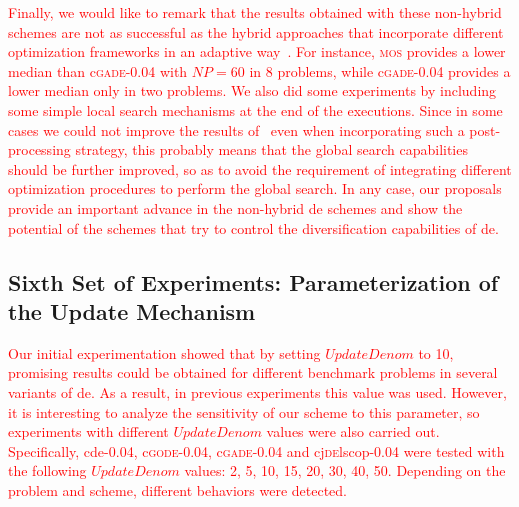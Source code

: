 \documentclass[preprint,3p]{elsarticle}
\newcommand{\CDE}{c{\sc de}}
\newcommand{\DE}{{\sc de}}
\begin{document}


\textcolor{red}{
Finally, we would like to remark that the results obtained with these non-hybrid schemes are not as successful as
the hybrid approaches that incorporate different optimization frameworks in an adaptive way~\cite{LaTorre:11}.
%
For instance, \textsc{mos} provides a lower median than c\textsc{gade-0.04} with $NP = 60$ 
in 8 problems, while c\textsc{gade-0.04} provides a lower median only in two problems.
%
We also did some experiments by including some simple local search mechanisms at the end of the executions.
%
Since in some cases we could not improve the results of~\cite{LaTorre:11} even when incorporating such a post-processing strategy, this probably means that
the global search capabilities should be further improved, so as to avoid the requirement of integrating different optimization procedures
to perform the global search.
%
In any case, our proposals provide an important advance in the non-hybrid \DE{} schemes and show the potential of the schemes that try to control the
diversification capabilities of \DE{}.
}

\subsection{Sixth Set of Experiments: Parameterization of the Update Mechanism}

\textcolor{red}{
Our initial experimentation showed that by setting $UpdateDenom$ to 10, promising results could be obtained for different benchmark problems
in several variants of \DE{}.
%
As a result, in previous experiments this value was used.
%
However, it is interesting to analyze the sensitivity of our scheme to this parameter, so experiments with different $UpdateDenom$ values 
were also carried out.
%
Specifically, \CDE{}-0.04, c\textsc{gode-0.04}, c\textsc{gade-0.04} and cj\textsc{de}lscop-0.04 were tested with the following $UpdateDenom$ values: 2, 5, 10, 15, 20, 30, 40, 50.
%
Depending on the problem and scheme, different behaviors were detected.
}
\end{document}
